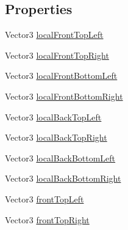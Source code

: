 \subsection*{Properties}
\begin{DoxyCompactItemize}
\item 
Vector3 \mbox{\hyperlink{struct_ext_debug_1_1_box_a03fca2f77524affc42916ccf7ff8b75c}{local\+Front\+Top\+Left}}
\item 
Vector3 \mbox{\hyperlink{struct_ext_debug_1_1_box_a2770f1b4de3e37e1a1af7a32a465098c}{local\+Front\+Top\+Right}}
\item 
Vector3 \mbox{\hyperlink{struct_ext_debug_1_1_box_a6f388475634f4216e91f545f99fa9a68}{local\+Front\+Bottom\+Left}}
\item 
Vector3 \mbox{\hyperlink{struct_ext_debug_1_1_box_aec0712c7c8bce0d23de31b730da840ac}{local\+Front\+Bottom\+Right}}
\item 
Vector3 \mbox{\hyperlink{struct_ext_debug_1_1_box_a255bff94119894e169d7934415f6637f}{local\+Back\+Top\+Left}}
\item 
Vector3 \mbox{\hyperlink{struct_ext_debug_1_1_box_ab028a1397a558e004eac7ab7066c6676}{local\+Back\+Top\+Right}}
\item 
Vector3 \mbox{\hyperlink{struct_ext_debug_1_1_box_ad084a73d8d32c0a3c47f3badcd9953dc}{local\+Back\+Bottom\+Left}}
\item 
Vector3 \mbox{\hyperlink{struct_ext_debug_1_1_box_af460db26828841cf2c2049742c6eba37}{local\+Back\+Bottom\+Right}}
\item 
Vector3 \mbox{\hyperlink{struct_ext_debug_1_1_box_a977354c165e6dbe82e12ef60f4d2c589}{front\+Top\+Left}}
\item 
Vector3 \mbox{\hyperlink{struct_ext_debug_1_1_box_ab35709d1b02d3bb9a367f879a2cecee6}{front\+Top\+Right}}

\end{DoxyCompactItemize}
